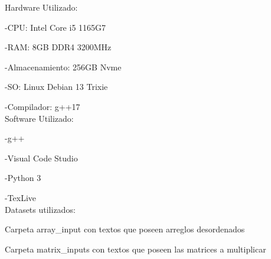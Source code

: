 Hardware Utilizado:

-CPU: Intel Core i5 1165G7

-RAM: 8GB DDR4 3200MHz

-Almacenamiento: 256GB Nvme

-SO: Linux Debian 13 Trixie

-Compilador: g++17 \\
Software Utilizado:

-g++

-Visual Code Studio

-Python 3

-TexLive \\

Datasets utilizados: 

Carpeta array\_input con textos que poseen arreglos desordenados

Carpeta matrix\_inputs con textos que poseen las matrices a multiplicar

